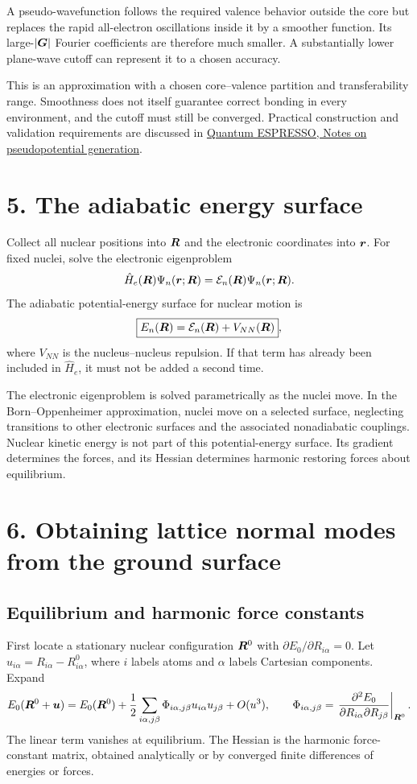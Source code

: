 A pseudo-wavefunction follows the required valence behavior outside the core but replaces the rapid all-electron oscillations inside it by a smoother function. Its large-$|\boldsymbol{G}|$ Fourier coefficients are therefore much smaller. A substantially lower plane-wave cutoff can represent it to a chosen accuracy.

This is an approximation with a chosen core--valence partition and transferability range. Smoothness does not itself guarantee correct bonding in every environment, and the cutoff must still be converged. Practical construction and validation requirements are discussed in
\href{https://www.quantum-espresso.org/wp-content/uploads/2022/03/pseudo-gen.pdf}{Quantum ESPRESSO, Notes on pseudopotential generation}.

\section*{5. The adiabatic energy surface}
Collect all nuclear positions into $\boldsymbol{R}$ and the electronic coordinates into $\boldsymbol{r}$. For fixed nuclei, solve the electronic eigenproblem
\[
\hat H_e(\boldsymbol{R})\Psi_n(\boldsymbol{r};\boldsymbol{R})
=\mathcal E_n(\boldsymbol{R})\Psi_n(\boldsymbol{r};\boldsymbol{R}).
\]
The adiabatic potential-energy surface for nuclear motion is
\[
\boxed{E_n(\boldsymbol{R})=\mathcal E_n(\boldsymbol{R})+V_{NN}(\boldsymbol{R})},
\]
where $V_{NN}$ is the nucleus--nucleus repulsion. If that term has already been included in $\hat H_e$, it must not be added a second time.

The electronic eigenproblem is solved parametrically as the nuclei move. In the Born--Oppenheimer approximation, nuclei move on a selected surface, neglecting transitions to other electronic surfaces and the associated nonadiabatic couplings. Nuclear kinetic energy is not part of this potential-energy surface. Its gradient determines the forces, and its Hessian determines harmonic restoring forces about equilibrium.

\section*{6. Obtaining lattice normal modes from the ground surface}
\subsection*{Equilibrium and harmonic force constants}
First locate a stationary nuclear configuration $\boldsymbol{R}^0$ with
$\partial E_0/\partial R_{i\alpha}=0$. Let
$u_{i\alpha}=R_{i\alpha}-R^0_{i\alpha}$, where $i$ labels atoms and $\alpha$ labels Cartesian components. Expand
\[
E_0(\boldsymbol{R}^0+\boldsymbol{u})=E_0(\boldsymbol{R}^0)
+\frac12\sum_{i\alpha,j\beta}\Phi_{i\alpha,j\beta}
 u_{i\alpha}u_{j\beta}+O(u^3),
\qquad
\Phi_{i\alpha,j\beta}
=\left.\frac{\partial^2E_0}{\partial R_{i\alpha}\partial R_{j\beta}}\right|_{\boldsymbol{R}^0}.
\]
The linear term vanishes at equilibrium. The Hessian is the harmonic force-constant matrix, obtained analytically or by converged finite differences of energies or forces.

